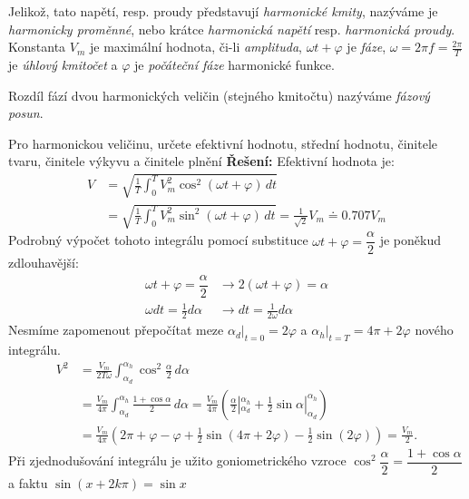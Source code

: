     Jelikož, tato napětí, resp. proudy představují \emph{harmonické kmity}, nazýváme je
    \emph{harmonicky proměnné}, nebo krátce \emph{harmonická napětí} resp. \emph{harmonická
    proudy}. Konstanta $V_m$ je maximální hodnota, či-li \emph{amplituda}, $\omega t + \varphi$ je
    \emph{fáze}, $\omega = 2\pi f = \frac{2\pi}{T}$ je \emph{úhlový kmitočet} a $\varphi$ je
    \emph{počáteční fáze} harmonické funkce.
    
    Rozdíl fází dvou harmonických veličin (stejného kmitočtu) nazýváme \emph{fázový posun}.
    
    \begin{example}
      Pro harmonickou veličinu, určete efektivní hodnotu, střední hodnotu, činitele tvaru, činitele
      výkyvu a činitele plnění      
      \textbf{Řešení:} Efektivní hodnota je:
      \begin{align}
        V &= \sqrt{\frac{1}{T}\int_0^TV_m^2\cos^2{(\omega t + \varphi)}\,dt} \\ \nonumber
          &= \sqrt{\frac{1}{T}\int_0^TV_m^2\sin^2{(\omega t + \varphi)}\,dt} = 
             \frac{1}{\sqrt{2}}V_m \doteq 0.707 V_m   
      \end{align}
      Podrobný výpočet tohoto integrálu pomocí substituce $\omega t + \varphi=\dfrac{\alpha}{2}$ je
      poněkud zdlouhavější:
      \begin{align*}
        \omega t + \varphi=\dfrac{\alpha}{2}   & \rightarrow  2(\omega t + \varphi) = \alpha      \\ 
        \omega dt = \frac{1}{2}d\alpha         & \rightarrow dt = \frac{1}{2\omega}d\alpha
      \end{align*}
      Nesmíme zapomenout přepočítat meze $\alpha_d|_{t=0}=2\varphi$ a $\alpha_h|_{t=T} = 
      4\pi+2\varphi$ nového integrálu.
      \begin{align*}
         V^2  &= \frac{V_m}{2T\omega}\int_{\alpha_d}^{\alpha_h}\cos^2\frac{\alpha}{2}\,d\alpha    \\
              &= \frac{V_m}{4\pi}\int_{\alpha_d}^{\alpha_h}\frac{1+\cos\alpha}{2}\,d\alpha  
               = \frac{V_m}{4\pi}\left(\frac{\alpha}{2}|_{\alpha_d}^{\alpha_h}
               + \frac{1}{2}\sin\alpha|_{\alpha_d}^{\alpha_h}\right)                              \\
              &= \frac{V_m}{4\pi}\left(2\pi+\varphi-\varphi 
               + \frac{1}{2}\sin(4\pi+2\varphi)
                -\frac{1}{2}\sin(2\varphi)\right) = \frac{V_m}{2}.  
      \end{align*}  
      Při zjednodušování integrálu je užito goniometrického vzroce
      $\cos^2\dfrac{\alpha}{2}=\dfrac{1+\cos\alpha}{2}$ a faktu $\sin(x+2k\pi)=\sin x$
      

\end{example}
